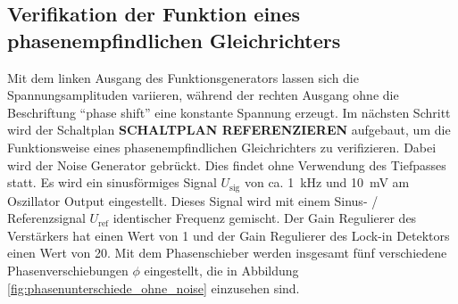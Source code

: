 %
%
%
%
%
%
\subsection[]{Verifikation der Funktion eines phasenempfindlichen Gleichrichters}
\label{sec:gleichrichter}
Mit dem linken Ausgang des Funktionsgenerators lassen sich die Spannungsamplituden variieren,
während der rechten Ausgang ohne die Beschriftung \enquote{phase shift} eine konstante Spannung erzeugt.
%
Im nächsten Schritt wird der Schaltplan \textbf{SCHALTPLAN REFERENZIEREN} aufgebaut,
um die Funktionsweise eines phasenempfindlichen Gleichrichters zu verifizieren.
Dabei wird der Noise Generator gebrückt.
Dies findet ohne Verwendung des Tiefpasses statt.
Es wird ein sinusförmiges Signal $U_\text{sig}$ von ca. \qty[]{1}{\kilo\hertz} und \qty[]{10}{\milli\volt} am Oszillator Output eingestellt.
Dieses Signal wird mit einem Sinus- / Referenzsignal $U_\text{ref}$ identischer Frequenz gemischt.
Der Gain Regulierer des Verstärkers hat einen Wert von 1 und der Gain Regulierer des Lock-in Detektors einen Wert von 20.
Mit dem Phasenschieber werden insgesamt fünf verschiedene Phasenverschiebungen $\phi$ eingestellt,
die in Abbildung \ref{fig:phasenunterschiede_ohne_noise} einzusehen sind.
%
